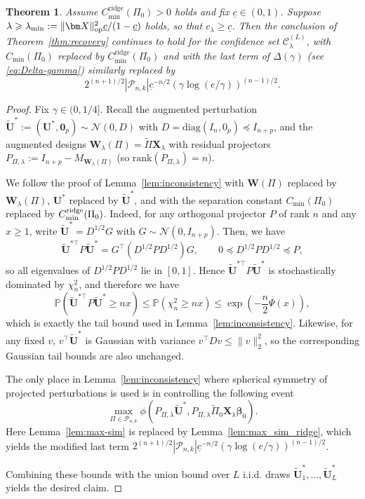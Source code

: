 \documentclass[11pt, reqno]{amsart}
\newcommand{\bP}{\mathbb{P}}
\renewcommand{\tilde}{\widetilde}
\renewcommand{\le}{\leqslant}
\renewcommand{\ge}{\geqslant}
\newcommand{\mC}{\mathcal{C}}
\newcommand{\mP}{\mathcal{P}}
\newcommand{\1}{\mbox{1}\hspace{-0.25em}\mbox{l}}
\newcommand{\rank}{\mathrm{rank}}
\theoremstyle{definition}\newtheorem{problem}{Problem}[section]
\theoremstyle{definition}\newtheorem{definition}[problem]{Definition}
\theoremstyle{remark}\newtheorem{assumption}{Assumption}
\theoremstyle{remark}\newtheorem{remark}[problem]{Remark}
\theoremstyle{definition}\newtheorem{example}[problem]{Example}
\theoremstyle{plain}\newtheorem{theorem}[problem]{Theorem}
\theoremstyle{plain}\newtheorem{question}[problem]{Question}
\theoremstyle{plain}\newtheorem{lemma}[problem]{Lemma}
\theoremstyle{plain}\newtheorem{proposition}[problem]{Proposition}
\theoremstyle{plain}\newtheorem{corollary}[problem]{Corollary}
\theoremstyle{plain}\newtheorem{conjecture}[problem]{Conjecture}
\begin{document}
\begin{theorem}\label{thm:candidate_set_ridge}
Assume $C_{\min}^{\mathrm{ridge}}(\Pi_0)>0$ holds and fix $\underline c\in(0,1)$.
Suppose $\lambda\ge \lambda_{\min}:=\|\bm X\|_{\rm op}^2\underline c/(1-\underline c)$ holds, so that $c_\lambda\ge \underline c$.
Then the conclusion of Theorem~\ref{thm:recovery} continues to hold for the confidence set $\mC_\lambda^{(L)}$,
with $C_{\min}(\Pi_0)$ replaced by $C_{\min}^{\mathrm{ridge}}(\Pi_0)$ and with the last term of $\Delta(\gamma)$
(see \eqref{eq:Delta-gamma}) similarly replaced by
\[
2^{(n+1)/2}|\mP_{n,k}|\underline c^{-n/2}\left(\gamma\log(e/\gamma)\right)^{(n-1)/2}.
\]
\end{theorem}

\begin{proof}
Fix $\gamma\in(0,1/4]$.
Recall the augmented perturbation $\tilde{\bm U}^*:=(\bm U^*,\bm 0_p)\sim\mathcal N(0,D)$ with
$D=\mathrm{diag}(I_n,0_p)\preceq I_{n+p}$, and the augmented designs
$\bm W_\lambda(\Pi)=\tilde\Pi\bm X_\lambda$ with residual projectors
$P_{\Pi,\lambda}:=I_{n+p}-M_{\bm W_\lambda(\Pi)}$ (so $\rank(P_{\Pi,\lambda})=n$).

We follow the proof of Lemma~\ref{lem:inconsistency} with $\bm W(\Pi)$ replaced by $\bm W_\lambda(\Pi)$,
$\bm U^*$ replaced by $\tilde{\bm U}^*$, and with the separation constant
$C_{\min}(\Pi_0)$ replaced by $C_{\min}^{\rm ridge}(\Pi_0)$.
Indeed, for any orthogonal projector $P$ of rank $n$ and any $x\ge 1$, write
$\tilde{\bm U}^*=D^{1/2}G$ with $G\sim\mathcal N(0,I_{n+p})$. Then, we have
\[
\tilde{\bm U}^{*\top}P\tilde{\bm U}^*
=G^\top\left(D^{1/2}PD^{1/2}\right)G,
\qquad
0\preceq D^{1/2}PD^{1/2}\preceq P,
\]
so all eigenvalues of $D^{1/2}PD^{1/2}$ lie in $[0,1]$. Hence
$\tilde{\bm U}^{*\top}P\tilde{\bm U}^*$ is stochastically dominated by $\chi_n^2$, and therefore we have
\[
\bP\left(\tilde{\bm U}^{*\top}P\tilde{\bm U}^*\ge nx\right)
\le \bP(\chi_n^2\ge nx)
\le \exp\left(-\frac n2\Psi(x)\right),
\]
which is exactly the tail bound used in Lemma~\ref{lem:inconsistency}.
Likewise, for any fixed $v$, $v^\top \tilde{\bm U}^*$ is Gaussian with variance $v^\top D v\le \|v\|_2^2$,
so the corresponding Gaussian tail bounds are also unchanged.

The only place in Lemma~\ref{lem:inconsistency} where spherical symmetry of projected perturbations is used
is in controlling the following event
\[
\max_{\Pi\in\mP_{n,k}}
\phi\left(P_{\Pi,\lambda}\tilde{\bm U}^*,P_{\Pi,\lambda}\tilde\Pi_0\bm X_\lambda\bm\beta_0\right).
\]
Here Lemma~\ref{lem:max-sim} is replaced by Lemma~\ref{lem:max_sim_ridge}, which yields the modified last
term $2^{(n+1)/2}|\mP_{n,k}|\underline c^{-n/2}(\gamma\log(e/\gamma))^{(n-1)/2}$.

Combining these bounds with the union bound over $L$ i.i.d. draws
$\tilde{\bm U}_1^*,\dots,\tilde{\bm U}_L^*$ yields the desired claim.
\end{proof}
\end{document}
